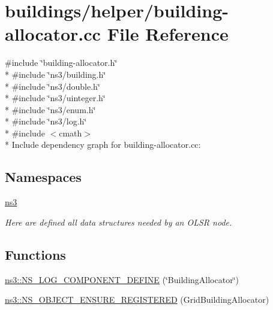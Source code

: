 \hypertarget{building-allocator_8cc}{}\section{buildings/helper/building-\/allocator.cc File Reference}
\label{building-allocator_8cc}
{\ttfamily \#include \char`\"{}building-\/allocator.\+h\char`\"{}}\\*
{\ttfamily \#include \char`\"{}ns3/building.\+h\char`\"{}}\\*
{\ttfamily \#include \char`\"{}ns3/double.\+h\char`\"{}}\\*
{\ttfamily \#include \char`\"{}ns3/uinteger.\+h\char`\"{}}\\*
{\ttfamily \#include \char`\"{}ns3/enum.\+h\char`\"{}}\\*
{\ttfamily \#include \char`\"{}ns3/log.\+h\char`\"{}}\\*
{\ttfamily \#include $<$cmath$>$}\\*
Include dependency graph for building-\/allocator.cc\+:
\subsection*{Namespaces}
\begin{DoxyCompactItemize}
\item 
 \hyperlink{namespacens3}{ns3}
\begin{DoxyCompactList}\small\item\em Here are defined all data structures needed by an O\+L\+SR node. \end{DoxyCompactList}\end{DoxyCompactItemize}
\subsection*{Functions}
\begin{DoxyCompactItemize}
\item 
\hyperlink{namespacens3_a9e4d104277260fdfa3c14cb9a2dd78f0}{ns3\+::\+N\+S\+\_\+\+L\+O\+G\+\_\+\+C\+O\+M\+P\+O\+N\+E\+N\+T\+\_\+\+D\+E\+F\+I\+NE} (\char`\"{}Building\+Allocator\char`\"{})
\item 
\hyperlink{namespacens3_a0a3acc931ec43cf751a7d926ec901cd7}{ns3\+::\+N\+S\+\_\+\+O\+B\+J\+E\+C\+T\+\_\+\+E\+N\+S\+U\+R\+E\+\_\+\+R\+E\+G\+I\+S\+T\+E\+R\+ED} (Grid\+Building\+Allocator)
\end{DoxyCompactItemize}

